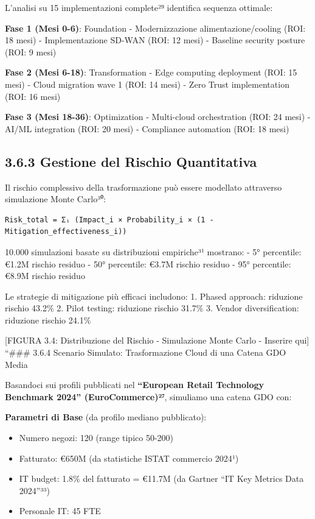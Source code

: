 \documentclass[12pt,a4paper,oneside]{book}
\providecommand{\tightlist}{%
  \setlength{\itemsep}{0pt}\setlength{\parskip}{0pt}
}
\numberwithin{figure}{chapter} %
\numberwithin{table}{chapter}  %
\begin{document}
L'analisi su 15 implementazioni complete²⁹ identifica sequenza ottimale:

\textbf{Fase 1 (Mesi 0-6)}: Foundation - Modernizzazione
alimentazione/cooling (ROI: 18 mesi) - Implementazione SD-WAN (ROI: 12
mesi) - Baseline security posture (ROI: 9 mesi)

\textbf{Fase 2 (Mesi 6-18)}: Transformation - Edge computing deployment
(ROI: 15 mesi) - Cloud migration wave 1 (ROI: 14 mesi) - Zero Trust
implementation (ROI: 16 mesi)

\textbf{Fase 3 (Mesi 18-36)}: Optimization - Multi-cloud orchestration
(ROI: 24 mesi) - AI/ML integration (ROI: 20 mesi) - Compliance
automation (ROI: 18 mesi)

\subsection{3.6.3 Gestione del Rischio
Quantitativa}\label{gestione-del-rischio-quantitativa}

Il rischio complessivo della trasformazione può essere modellato
attraverso simulazione Monte Carlo³⁰:

\begin{verbatim}
Risk_total = Σᵢ (Impact_i × Probability_i × (1 - Mitigation_effectiveness_i))
\end{verbatim}

10.000 simulazioni basate su distribuzioni empiriche³¹ mostrano: - 5°
percentile: €1.2M rischio residuo - 50° percentile: €3.7M rischio
residuo - 95° percentile: €8.9M rischio residuo

Le strategie di mitigazione più efficaci includono: 1. Phased approach:
riduzione rischio 43.2\% 2. Pilot testing: riduzione rischio 31.7\% 3.
Vendor diversification: riduzione rischio 24.1\%

{[}FIGURA 3.4: Distribuzione del Rischio - Simulazione Monte Carlo -
Inserire qui{]} ``\#\#\# 3.6.4 Scenario Simulato: Trasformazione Cloud
di una Catena GDO Media

Basandoci sui profili pubblicati nel \textbf{``European Retail
Technology Benchmark 2024'' (EuroCommerce)²⁷}, simuliamo una catena GDO
con:

\textbf{Parametri di Base} (da profilo mediano pubblicato):

\begin{itemize}
\tightlist
\item
  Numero negozi: 120 (range tipico 50-200)\\
\item
  Fatturato: €650M (da statistiche ISTAT commercio 2024¹)\\
\item
  IT budget: 1.8\% del fatturato = €11.7M (da Gartner ``IT Key Metrics
  Data 2024''³³)\\
\item
  Personale IT: 45 FTE
\end{itemize}
\end{document}
